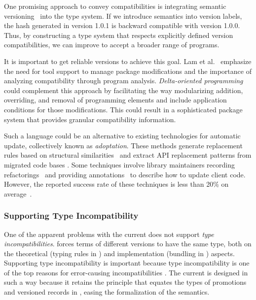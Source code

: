 One promising approach to convey compatibilities is integrating semantic versioning~\cite{preston2013semantic} into the type system.
If we introduce semantics into version labels, the hash generated in version 1.0.1 is backward compatible with version 1.0.0. Thus, by constructing a type system that respects explicitly defined version compatibilities, we can improve \mylang{} to accept a broader range of programs.

It is important to get reliable versions to achieve this goal.
Lam et al.~\cite{10.1145/3426428.3426922} emphasize the need for tool support to manage package modifications and the importance of analyzing compatibility through program analysis.
\emph{Delta-oriented programming}~\cite{10.1145/1868688.1868696,10.5555/1885639.1885647,10.1145/1960275.1960283} could complement this approach by facilitating the way modularizing addition, overriding, and removal of programming elements and include application conditions for those modifications.
This could result in a sophisticated package system that provides granular compatibility information.

Such a language could be an alternative to existing technologies for automatic update, collectively known as \emph{adoptation}.
These methods generate replacement rules based on structural similarities~\cite{Cossette2014,5970177} and extract API replacement patterns from migrated code bases \cite{10.1145/1368088.1368153}.
Some techniques involve library maintainers recording refactorings~\cite{10.1002/smr.328,1553570} and providing annotations~\cite{565039} to describe how to update client code. However, the reported success rate of these techniques is less than 20\% on average~\cite{10.1145/2393596.2393661}.

\subsubsection{Supporting Type Incompatibility}
\label{sec:typeincompatibilities}
One of the apparent problems with the current \mylang{} does not support \emph{type incompatibilities}.
\mylang{} forces terms of different versions to have the same type, both on the theoretical (typing rules in \corelang{}) and implementation (bundling in \vlmini{}) aspects. Supporting type incompatibility is important because type incompatibility is one of the top reasons for error-causing incompatibilities \cite{RAEMAEKERS2017140}.
The current \mylang{} is designed in such a way because it retains the principle that equates the types of promotions and versioned records in \corelang{}, easing the formalization of the semantics.

